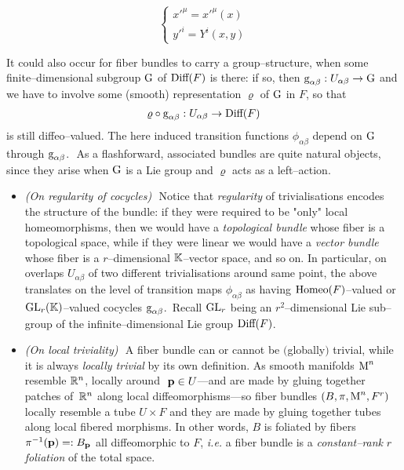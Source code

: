 \begin{equation}\label{gen_trans_maps}
    \begin{cases}
    {x'}^\mu={x'}^\mu(x)\\
    {y'}^i=Y^i(x,y)
\end{cases}
\end{equation}

It could also occur for fiber bundles to carry a group--structure, when some finite--dimensional subgroup $\text{\normalfont G}$ of $\text{\normalfont Diff}(F)$ is there: if so, then $\text{\normalfont g}_{\alpha\beta}:U_{\alpha\beta}\to\text{\normalfont G}$ and we have to involve some (smooth) representation $\varrho$ of $\text{\normalfont G}$ in $F$, so that
$$\varrho\circ\text{\normalfont g}_{\alpha\beta}:U_{\alpha\beta}\to\text{\normalfont Diff}(F)$$
is still diffeo--valued. The here induced transition functions $\phi_{\alpha\beta}$ depend on $\text{\normalfont G}$ through $\text{\normalfont g}_{\alpha\beta}$.\,\, As a flashforward, associated bundles are quite natural objects, since they arise when $\text{\normalfont G}$ is a Lie group and $\varrho$ acts as a left--action. 
\begin{remark}
\begin{itemize}
    \item \emph{(On regularity of cocycles)}\,\, Notice that \emph{regularity} of trivialisations encodes the structure of the bundle: if they were required to be "only" local homeomorphisms, then we would have a \emph{topological bundle} whose fiber is a topological space, while if they were linear we would have a \emph{vector bundle} whose fiber is a $r$--dimensional $\mathbb{K}$--vector space, and so on. In particular, on overlaps $U_{\alpha\beta}$ of two different trivialisations around same point, the above translates on the level of transition maps $\phi_{\alpha\beta}$ as having $\text{\normalfont Homeo}(F)$--valued or $\text{\normalfont GL}_r(\mathbb{K})$--valued cocycles $\text{\normalfont g}_{\alpha\beta}$.\, Recall $\text{\normalfont GL}_r$ being an $r^2$--dimensional Lie sub--group of the infinite--dimensional Lie group $\text{\normalfont Diff}(F)$.

    \item \emph{(On local triviality)}\,\,
    A fiber bundle can or cannot be $($globally$)$ trivial, while it is always \emph{locally trivial} by its own definition. As smooth manifolds $\text{\normalfont M}^n$ resemble $\mathbb{R}^n$, locally around \,\,$\mathbf{p}\in U$---and are made by gluing together patches of \,$\mathbb{R}^n$ along local diffeomorphisms---so fiber bundles $(B,\pi,\text{\normalfont M}^n,F^r)$ locally resemble a tube $U\times F$ and they are made by gluing together tubes along local fibered morphisms. In other words, $B$ is foliated by fibers $\pi^{-1}(\mathbf{p})=:B_{\mathbf{p}}$ all diffeomorphic to $F$, \emph{i.e.} a fiber bundle is a \emph{constant--rank} $r$ \emph{foliation} of the total space.
\end{itemize}
    
\end{remark}
